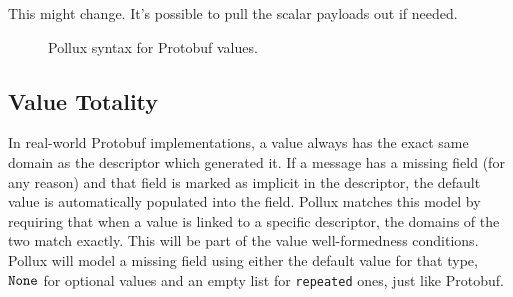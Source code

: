 {\color{red} This might change. It's possible to pull the scalar payloads out if
needed.}

\begin{figure}[h]
  \centering
  \begin{syntax}



    \abstractCategory[Strings]{\str}

    \categoryFromSet[32-bit Unsigned Integers]{\mathrm{u^{32}}}{[0, 2^{32})}

    \categoryFromSet[64-bit Unsigned Integers]{\mathrm{u^{64}}}{[0, 2^{64})}

    \category[Payload]{\pay}
    \alternative{\str}
    \alternative{\bs}
    \alternative{\m}

    \category[Slot]{\st}
    \alternative{\impslot{\pay}}
    \alternative{\optslot{\none}}
    \alternative{\optslot{\pay}}

    \alternative{\nil}

    \category[Message]{\m}
  \end{syntax}
  \caption{Pollux syntax for Protobuf values.}\label{fig:proto-val-syn}
\end{figure}

\subsection{Value Totality}\label{sec:value-totality}

In real-world Protobuf implementations, a value always has the exact same domain
as the descriptor which generated it. If a message has a missing field (for any
reason) and that field is marked as implicit in the descriptor, the default
value is automatically populated into the field. Pollux matches this model by
requiring that when a value is linked to a specific descriptor, the domains of
the two match exactly. This will be part of the value well-formedness
conditions. Pollux will model a missing field using either the default value for
that type, $\mathtt{None}$ for optional values and an empty list for
\texttt{repeated} ones, just like Protobuf.

